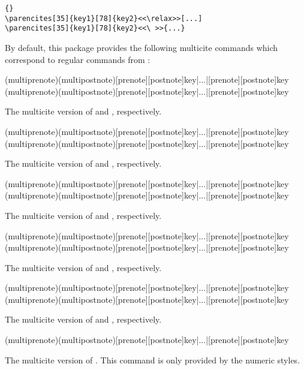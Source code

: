 \begin{lstlisting}[style=latex,showspaces]{}
\parencites[35]{key1}[78]{key2}<<\relax>>[...]
\parencites[35]{key1}[78]{key2}<<\ >>{...}
\end{lstlisting}
%
By default, this package provides the following multicite commands which correspond to regular commands from :

\begin{ltxsyntax}

(multiprenote)(multipostnote)[prenote][postnote]{key}|...|[prenote][postnote]{key}
(multiprenote)(multipostnote)[prenote][postnote]{key}|...|[prenote][postnote]{key}

The multicite version of  and , respectively.

(multiprenote)(multipostnote)[prenote][postnote]{key}|...|[prenote][postnote]{key}
(multiprenote)(multipostnote)[prenote][postnote]{key}|...|[prenote][postnote]{key}

The multicite version of  and , respectively.

(multiprenote)(multipostnote)[prenote][postnote]{key}|...|[prenote][postnote]{key}
(multiprenote)(multipostnote)[prenote][postnote]{key}|...|[prenote][postnote]{key}

The multicite version of  and , respectively.

(multiprenote)(multipostnote)[prenote][postnote]{key}|...|[prenote][postnote]{key}
(multiprenote)(multipostnote)[prenote][postnote]{key}|...|[prenote][postnote]{key}

The multicite version of  and , respectively.

(multiprenote)(multipostnote)[prenote][postnote]{key}|...|[prenote][postnote]{key}
(multiprenote)(multipostnote)[prenote][postnote]{key}|...|[prenote][postnote]{key}

The multicite version of  and , respectively.

(multiprenote)(multipostnote)[prenote][postnote]{key}|...|[prenote][postnote]{key}

The multicite version of . This command is only provided by the numeric styles.

\end{ltxsyntax}

